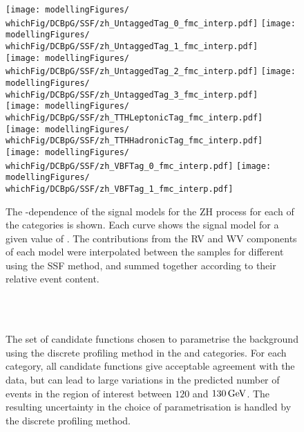\begin{figure}[htp!]
\centering
\texttt{[image: modellingFigures/\\whichFig/DCBpG/SSF/zh\_UntaggedTag\_0\_fmc\_interp.pdf]} 
\texttt{[image: modellingFigures/\\whichFig/DCBpG/SSF/zh\_UntaggedTag\_1\_fmc\_interp.pdf]} \\ 
\texttt{[image: modellingFigures/\\whichFig/DCBpG/SSF/zh\_UntaggedTag\_2\_fmc\_interp.pdf]} 
\texttt{[image: modellingFigures/\\whichFig/DCBpG/SSF/zh\_UntaggedTag\_3\_fmc\_interp.pdf]} \\
\texttt{[image: modellingFigures/\\whichFig/DCBpG/SSF/zh\_TTHLeptonicTag\_fmc\_interp.pdf]} 
\texttt{[image: modellingFigures/\\whichFig/DCBpG/SSF/zh\_TTHHadronicTag\_fmc\_interp.pdf]} \\ 
\texttt{[image: modellingFigures/\\whichFig/DCBpG/SSF/zh\_VBFTag\_0\_fmc\_interp.pdf]} 
\texttt{[image: modellingFigures/\\whichFig/DCBpG/SSF/zh\_VBFTag\_1\_fmc\_interp.pdf]} \\
\caption{The \mH-dependence of the signal models for the ZH process for each of the categories is shown. Each curve shows the signal model for a given value of \mH. The contributions from the RV and WV components of each model were interpolated between the samples for different \mH using the SSF method, and summed together according to their relative event content.}

\label{fig:model:sig_interpolation_zh}
\end{figure}

\begin{figure}[p]
 \begin{center}
 \\
 \\
 \caption{The set of candidate functions chosen to parametrise the background using the discrete profiling method in the \VBF and \ttH categories. For each category, all candidate functions give acceptable agreement with the data, but can lead to large variations in the predicted number of events in the region of interest between $120$ and $130\,\text{Ge\hspace{-.08em}V}$. The resulting uncertainty in the choice of parametrisation is handled by the discrete profiling method.}
 \label{fig:model_bkg_multipdf_bis}
 \end{center}
\end{figure}
